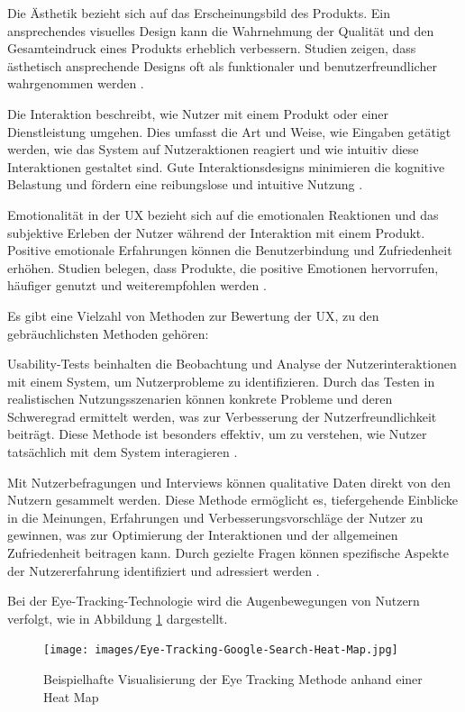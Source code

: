 Die Ästhetik bezieht sich auf das Erscheinungsbild des Produkts. 
Ein ansprechendes visuelles Design kann die Wahrnehmung der Qualität und den Gesamteindruck eines Produkts erheblich verbessern. 
Studien zeigen, dass ästhetisch ansprechende Designs oft als funktionaler und benutzerfreundlicher wahrgenommen werden \cite{Tractinsky}.

Die Interaktion beschreibt, wie Nutzer mit einem Produkt oder einer Dienstleistung umgehen. 
Dies umfasst die Art und Weise, wie Eingaben getätigt werden, wie das System auf Nutzeraktionen reagiert und wie intuitiv diese Interaktionen gestaltet sind. 
Gute Interaktionsdesigns minimieren die kognitive Belastung und fördern eine reibungslose und intuitive Nutzung \cite{interaction_design}.

Emotionalität in der UX bezieht sich auf die emotionalen Reaktionen und das subjektive Erleben der Nutzer während der Interaktion mit einem Produkt. 
Positive emotionale Erfahrungen können die Benutzerbindung und Zufriedenheit erhöhen. 
Studien belegen, dass Produkte, die positive Emotionen hervorrufen, häufiger genutzt und weiterempfohlen werden \cite{emotion}.

Es gibt eine Vielzahl von Methoden zur Bewertung der UX, zu den gebräuchlichsten Methoden gehören:

Usability-Tests beinhalten die Beobachtung und Analyse der Nutzerinteraktionen mit einem System, um Nutzerprobleme zu identifizieren. 
Durch das Testen in realistischen Nutzungsszenarien können konkrete Probleme und deren Schweregrad ermittelt werden, was zur Verbesserung der Nutzerfreundlichkeit beiträgt. 
Diese Methode ist besonders effektiv, um zu verstehen, wie Nutzer tatsächlich mit dem System interagieren \cite[S.165 ff.]{Nielsen}.

Mit Nutzerbefragungen und Interviews können qualitative Daten direkt von den Nutzern gesammelt werden. 
Diese Methode ermöglicht es, tiefergehende Einblicke in die Meinungen, Erfahrungen und Verbesserungsvorschläge der Nutzer zu gewinnen, was zur Optimierung der Interaktionen und der allgemeinen Zufriedenheit beitragen kann. 
Durch gezielte Fragen können spezifische Aspekte der Nutzererfahrung identifiziert und adressiert werden \cite{ux_bewertung_interview}.

Bei der Eye-Tracking-Technologie wird die Augenbewegungen von Nutzern verfolgt, wie in Abbildung \ref{eye_tracking} dargestellt. 

\begin{figure}[h]
    \centering
    \texttt{[image: images/Eye-Tracking-Google-Search-Heat-Map.jpg]}
    \caption[Beispielhafte Visualisierung der Eye Tracking Methode anhand einer Heat Map]{Beispielhafte Visualisierung der Eye Tracking Methode anhand einer Heat Map \cite{image_eye_tracking}}
    \label{eye_tracking}
\end{figure}

